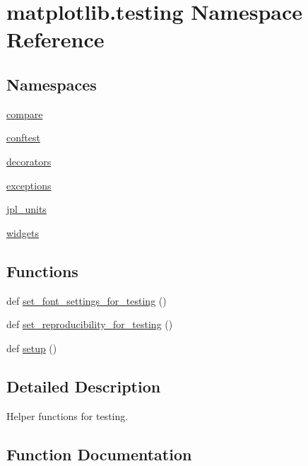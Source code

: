 \hypertarget{namespacematplotlib_1_1testing}{}\section{matplotlib.\+testing Namespace Reference}
\label{namespacematplotlib_1_1testing}
\subsection*{Namespaces}
\begin{DoxyCompactItemize}
\item 
 \hyperlink{namespacematplotlib_1_1testing_1_1compare}{compare}
\item 
 \hyperlink{namespacematplotlib_1_1testing_1_1conftest}{conftest}
\item 
 \hyperlink{namespacematplotlib_1_1testing_1_1decorators}{decorators}
\item 
 \hyperlink{namespacematplotlib_1_1testing_1_1exceptions}{exceptions}
\item 
 \hyperlink{namespacematplotlib_1_1testing_1_1jpl__units}{jpl\+\_\+units}
\item 
 \hyperlink{namespacematplotlib_1_1testing_1_1widgets}{widgets}
\end{DoxyCompactItemize}
\subsection*{Functions}
\begin{DoxyCompactItemize}
\item 
def \hyperlink{namespacematplotlib_1_1testing_a1f00437dcffc55d0cd1f90d1aa145c0d}{set\+\_\+font\+\_\+settings\+\_\+for\+\_\+testing} ()
\item 
def \hyperlink{namespacematplotlib_1_1testing_a52faea5be4a2f14a557b8adb5b7f3294}{set\+\_\+reproducibility\+\_\+for\+\_\+testing} ()
\item 
def \hyperlink{namespacematplotlib_1_1testing_a982fab1af51b1415bd9a633d60ac92d0}{setup} ()
\end{DoxyCompactItemize}


\subsection{Detailed Description}
\begin{DoxyVerb}Helper functions for testing.
\end{DoxyVerb}
 

\subsection{Function Documentation}
\mbox{\label{namespacematplotlib_1_1testing_a1f00437dcffc55d0cd1f90d1aa145c0d}} 
